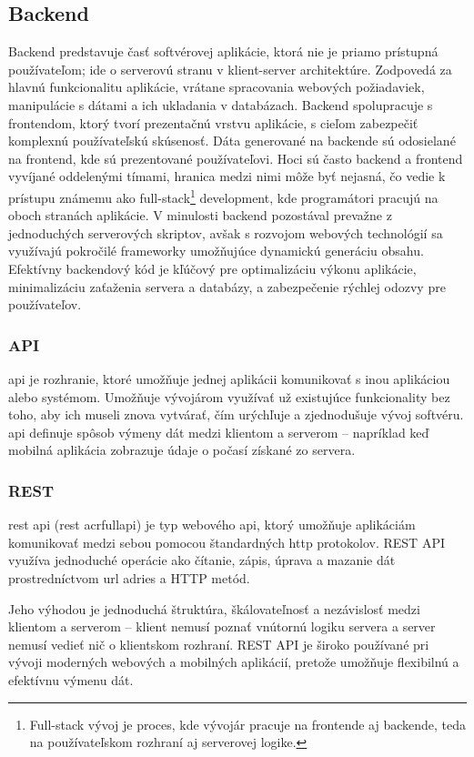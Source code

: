 \subsection{Backend}
Backend predstavuje časť softvérovej aplikácie, ktorá nie je priamo prístupná používateľom; ide o serverovú stranu v klient-server architektúre.
 Zodpovedá za hlavnú funkcionalitu aplikácie, vrátane spracovania webových požiadaviek, manipulácie s dátami a ich ukladania v databázach. Backend spolupracuje s frontendom, ktorý tvorí prezentačnú vrstvu aplikácie, s cieľom zabezpečiť komplexnú používateľskú skúsenosť. 
 Dáta generované na backende sú odosielané na frontend, kde sú prezentované používateľovi.
  Hoci sú často backend a frontend vyvíjané oddelenými tímami, hranica medzi nimi môže byť nejasná, čo vedie k prístupu známemu ako full-stack\footnote{Full-stack vývoj je proces, kde vývojár pracuje na frontende aj backende, teda na používateľskom rozhraní aj serverovej logike.} development, kde programátori pracujú na oboch stranách aplikácie.
   V minulosti backend pozostával prevažne z jednoduchých serverových skriptov, avšak s rozvojom webových technológií sa využívajú pokročilé frameworky umožňujúce dynamickú generáciu obsahu.
 Efektívny backendový kód je kľúčový pre optimalizáciu výkonu aplikácie, minimalizáciu zaťaženia servera a databázy, a zabezpečenie rýchlej odozvy pre používateľov. \cite{backend} 
 \subsubsection{API}
 \acrfull{api} je rozhranie, ktoré umožňuje jednej aplikácii komunikovať s inou aplikáciou alebo systémom. 
 Umožňuje vývojárom využívať už existujúce funkcionality bez toho, aby ich museli znova vytvárať, čím urýchľuje a zjednodušuje vývoj softvéru.
  \acrshort{api} definuje spôsob výmeny dát medzi klientom a serverom – napríklad keď mobilná aplikácia zobrazuje údaje o počasí získané zo servera.\cite{api}
 \subsubsection{REST}
 \acrshort{rest} \acrshort{api} (\acrfull{rest} acrfull{api}) je typ webového \acrshort{api}, ktorý umožňuje aplikáciám komunikovať medzi sebou pomocou štandardných \acrshort{http} protokolov. 
 REST API využíva jednoduché operácie ako čítanie, zápis, úprava a mazanie dát prostredníctvom \acrshort{url} adries a HTTP metód.

Jeho výhodou je jednoduchá štruktúra, škálovateľnosť a nezávislosť medzi klientom a serverom – klient nemusí poznať vnútornú logiku servera a server nemusí vedieť nič o klientskom rozhraní.
 REST API je široko používané pri vývoji moderných webových a mobilných aplikácií, pretože umožňuje flexibilnú a efektívnu výmenu dát.

